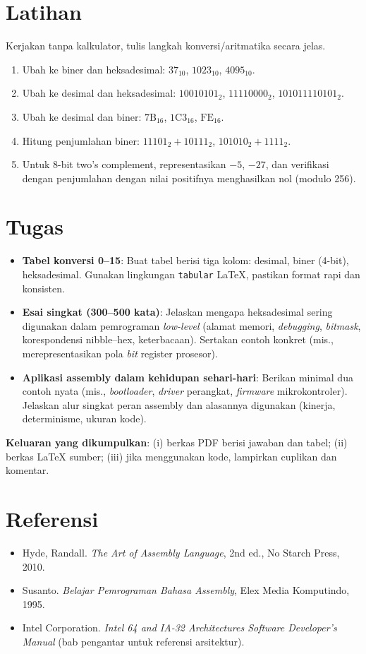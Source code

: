 \section{Latihan}
Kerjakan tanpa kalkulator, tulis langkah konversi/aritmatika secara jelas.
\begin{enumerate}
  \item Ubah ke biner dan heksadesimal: \(37_{10}\), \(1023_{10}\), \(4095_{10}\).
  \item Ubah ke desimal dan heksadesimal: \(10010101_2\), \(11110000_2\), \(101011110101_2\).
  \item Ubah ke desimal dan biner: \(\mathrm{7B}_{16}\), \(\mathrm{1C3}_{16}\), \(\mathrm{FE}_{16}\).
  \item Hitung penjumlahan biner: \(11101_2 + 10111_2\), \(101010_2 + 1111_2\).
  \item Untuk 8-bit two's complement, representasikan \(-5\), \(-27\), dan verifikasi dengan penjumlahan dengan nilai positifnya menghasilkan nol (modulo 256).
\end{enumerate}

\section{Tugas}
\begin{itemize}
  \item \textbf{Tabel konversi 0--15}: Buat tabel berisi tiga kolom: desimal, biner (4-bit), heksadesimal. Gunakan lingkungan \texttt{tabular} LaTeX, pastikan format rapi dan konsisten.
  \item \textbf{Esai singkat (300--500 kata)}: Jelaskan mengapa heksadesimal sering digunakan dalam pemrograman \textit{low-level} (alamat memori, \textit{debugging}, \textit{bitmask}, korespondensi nibble--hex, keterbacaan). Sertakan contoh konkret (mis., merepresentasikan pola \textit{bit} register prosesor).
  \item \textbf{Aplikasi assembly dalam kehidupan sehari-hari}: Berikan minimal dua contoh nyata (mis., \textit{bootloader}, \textit{driver} perangkat, \textit{firmware} mikrokontroler). Jelaskan alur singkat peran assembly dan alasannya digunakan (kinerja, determinisme, ukuran kode).
\end{itemize}
\noindent\textbf{Keluaran yang dikumpulkan}: (i) berkas PDF berisi jawaban dan tabel; (ii) berkas \LaTeX{} sumber; (iii) jika menggunakan kode, lampirkan cuplikan dan komentar.

\section{Referensi}
\begin{itemize}
  \item Hyde, Randall. \textit{The Art of Assembly Language}, 2nd ed., No Starch Press, 2010.
  \item Susanto. \textit{Belajar Pemrograman Bahasa Assembly}, Elex Media Komputindo, 1995.
  \item Intel Corporation. \textit{Intel 64 and IA-32 Architectures Software Developer's Manual} (bab pengantar untuk referensi arsitektur).
\end{itemize}
